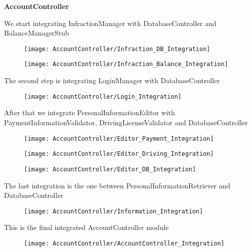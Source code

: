 \textbf{AccountController}

We start integrating InfractionManager with DatabaseController and BalanceManagerStub
\begin{figure}[H]
\centering
\texttt{[image: AccountController/Infraction\_DB\_Integration]}
\end{figure}

\begin{figure}[H]
\centering
\texttt{[image: AccountController/Infraction\_Balance\_Integration]}
\end{figure}

The second step is integrating LoginManager with DatabaseController
\begin{figure}[H]
\centering
\texttt{[image: AccountController/Login\_Integration]}
\end{figure}

After that we integrate PersonalInformationEditor with PaymentInformationValidator, DrivingLicenseValidator and DatabaseController
\begin{figure}[H]
\centering
\texttt{[image: AccountController/Editor\_Payment\_Integration]}
\end{figure}

\begin{figure}[H]
\centering
\texttt{[image: AccountController/Editor\_Driving\_Integration]}
\end{figure}

\begin{figure}[H]
\centering
\texttt{[image: AccountController/Editor\_DB\_Integration]}
\end{figure}

The last integration is the one between PersonalInformationRetriever and DatabaseController
\begin{figure}[H]
\centering
\texttt{[image: AccountController/Information\_Integration]}
\end{figure}

This is the final integrated AccountController module
\begin{figure}[H]
\centering
\texttt{[image: AccountController/AccountController\_Integration]}
\end{figure}